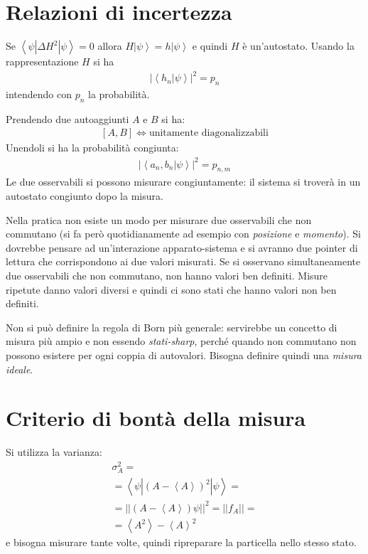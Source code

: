 \section{Relazioni di incertezza} %
Se $\left\langle \psi |\Delta H^2|\psi  \right\rangle=0$ allora $H\left |\psi  \right\rangle=h\left |\psi  \right\rangle$ e quindi $H$ è un'autostato. Usando la rappresentazione $H$ si ha
\begin{equation}\begin{split}
|\left\langle h_n|\psi  \right\rangle|^2=p_n
\end{split}\end{equation}
intendendo con $p_n$ la probabilità.

Prendendo due autoaggiunti $A$ e $B$ si ha:
\begin{equation}\begin{split}
\left[A,B\right] \Longleftrightarrow \textrm{unitamente diagonalizzabili}
\end{split}\end{equation}
Unendoli si ha la probabilità congiunta:
\begin{equation}\begin{split}
|\left\langle a_n,b_n|\psi  \right\rangle|^2=p_{n,m}
\end{split}\end{equation}
Le due osservabili si possono misurare congiuntamente: il sistema si troverà in un autostato congiunto dopo la misura.

Nella pratica non esiste un modo per misurare due osservabili che non commutano (si fa però quotidianamente ad esempio con \emph{posizione} e \emph{momento}). Si dovrebbe pensare ad un'interazione apparato-sistema e si avranno due pointer di lettura che corrispondono ai due valori misurati. Se si osservano simultaneamente due osservabili che non commutano, non hanno valori ben definiti. Misure ripetute danno valori diversi e quindi ci sono stati che hanno valori non ben definiti.

Non si può definire la regola di Born più generale: servirebbe un concetto di misura più ampio e non essendo \emph{stati-sharp}, perché quando non commutano non possono esistere per ogni coppia di autovalori. Bisogna definire quindi una \emph{misura ideale}.

\section{Criterio di bontà della misura} %
Si utilizza la varianza:
\begin{equation}\begin{split}
\sigma _A^2=\\
=\left\langle \psi |\left(A-\left\langle A \right\rangle\right)^2|\psi  \right\rangle=\\
=||\left(A-\left\langle A \right\rangle\right)\psi ||^2=||f_A||=\\
=\left\langle A^2 \right\rangle-\left\langle A \right\rangle^2
\end{split}\end{equation}
e bisogna misurare tante volte, quindi ripreparare la particella nello stesso stato.

